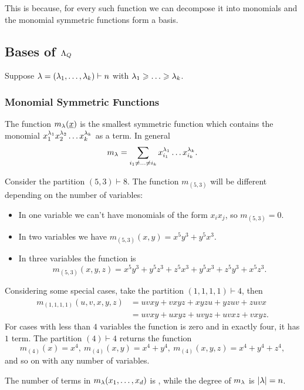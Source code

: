\documentclass[12pt]{memoir}
\begin{document}
This is because, for every such function we can decompose it into monomials and the monomial symmetric functions form a basis.

\subsection*{Bases of $\Lambda_Q$}

Suppose $\lambda=(\lambda_1,\dots,\lambda_k)\vdash n$ with $\la_1\geq\dots\geq\la_k$. 

\subsubsection*{Monomial Symmetric Functions}

The function $m_\lambda(\underline x)$ is the smallest symmetric function which contains the monomial $x_1^{\lambda_1}x_2^{\lambda_2}\dots x_k^{\lambda_k}$ as a term. In general 
$$m_\lambda=\sum_{i_1\neq\dots\neq i_k}x_{i_1}^{\lambda_1}\dots x_{i_k}^{\lambda_k}.$$

\begin{Ex}
    Consider the partition $(5,3)\vdash 8$. The function $m_{(5,3)}$ will be different depending on the number of variables:
    \begin{itemize}
        \itemsep=-0.4em
        \item In one variable we can't have monomials of the form $x_ix_j$, so $m_{(5,3)}=0$.
        \item In two variables we have $m_{(5,3)}(x,y)=x^5y^3+y^5x^3$.
        \item In three variables the function is 
        $$m_{(5,3)}(x,y,z)=x^5y^3+y^5z^3+z^5x^3+y^5x^3+z^5y^3+x^5z^3.$$
    \end{itemize}
    Considering some special cases, take the partition $(1,1,1,1)\vdash 4$, then 
\begin{align*}
    m_{(1,1,1,1)}(u,v,x,y,z)&=uvxy+vxyz+xyzu+yzuv+zuvx\\
    &=uvxy+uxyz+uvyz+uvxz+vxyz.
\end{align*}
For cases with less than $4$ variables the function is zero and in exactly four, it has $1$ term. The partition $(4)\vdash 4$ returns the function 
$$m_{(4)}(x)=x^4,\ m_{(4)}(x,y)=x^4+y^4,\ m_{(4)}(x,y,z)=x^4+y^4+z^4,$$
and so on with any number of variables.
\end{Ex}

\begin{Rmk}
    The number of terms in $m_\lambda(x_1,\dots,x_d)$ is , while the degree of $m_\lambda$ is $|\lambda|=n$.
\end{Rmk}
\end{document}
